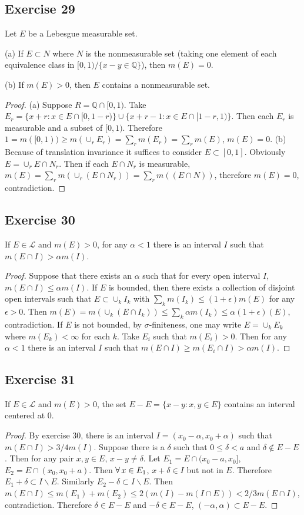 \subsection*{Exercise 29}
Let $E$ be a Lebesgue measurable set.
\par (a) If $E\subset N$ where $N$ is the nonmeasurable set (taking one element of each equivalence class in $[0,1)/\{x-y\in\mathbb{Q}\}$), then $m(E)=0$.
\par (b) If $m(E)>0$, then $E$ contains a nonmeasurable set.
\begin{proof}
    (a) Suppose $R=\mathbb{Q}\cap[0,1)$. Take $E_r=\{x+r:x\in E\cap[0,1-r)\}\cup\{x+r-1:x\in E\cap[1-r,1)\}$. Then each $E_r$ is measurable and a subset of $[0,1)$. Therefore $1=m([0,1))\ge m(\cup_r E_r)=\sum_r m(E_r)=\sum_rm(E)$, $m(E)=0$.
    (b) Because of translation invariance it suffices to consider $E\subset[0,1]$. Obviously $E=\cup_{r}E\cap N_r$. Then if each $E\cap N_r$ is measurable, $m(E)=\sum_r m(\cup_r(E\cap N_r))=\sum_r m((E\cap N))$, therefore $m(E)=0$, contradiction.
\end{proof}
\subsection*{Exercise 30}
If $E\in\mathcal{L}$ and $m(E)>0$, for any $\alpha<1$ there is an interval $I$ such that $m(E\cap I)>\alpha m(I)$.
\begin{proof}
    Suppose that there exists an $\alpha$ such that for every open interval $I$,  $m(E\cap I)\le\alpha m(I)$. If $E$ is bounded, then there exists a collection of disjoint open intervals such that $E\subset\cup_k I_k$ with $\sum_k m(I_k)\le(1+\epsilon)m(E)$ for any $\epsilon>0$. Then $m(E)=m(\cup_k (E\cap I_k))\le\sum_k\alpha m(I_k)\le\alpha(1+\epsilon)(E)$, contradiction. If $E$ is not bounded, by $\sigma$-finiteness, one may write $E=\cup_k E_k$ where $m(E_k)<\infty$ for each $k$. Take $E_i$ such that $m(E_i)>0$. Then for any $\alpha<1$ there is an interval $I$ such that $m(E\cap I)\ge m(E_i\cap I)>\alpha m(I)$. 
\end{proof}
\subsection*{Exercise 31}
If $E\in\mathcal{L}$ and $m(E)>0$, the set $E-E=\{x-y:x,y\in E\}$ contains an interval centered at $0$.
\begin{proof}
    By exercise 30, there is an interval $I=(x_0-\alpha,x_0+\alpha)$ such that $m(E\cap I)>3/4 m(I)$. Suppose there is a $\delta$ such that $0\le\delta<a$ and $\delta\not\in E-E$. Then for any pair $x,y\in E$, $x-y\neq\delta$. Let $E_1=E\cap(x_0-a,x_0]$, $E_2=E\cap(x_0,x_0+a)$. Then $\forall\, x\in E_1$, $x+\delta\in I$ but not in $E$. Therefore $E_1+\delta\subset I\backslash E$. Similarly $E_2-\delta\subset I\backslash E$. Then $m(E\cap I)\le m(E_1)+m(E_2)\le 2(m(I)-m(I\cap E))<2/3m(E\cap I)$, contradiction. Therefore $\delta\in E-E$ and $-\delta\in E-E$, $(-\alpha,\alpha)\subset E-E$.
\end{proof}
